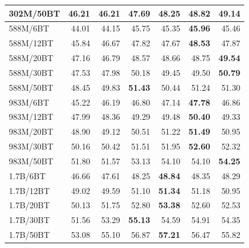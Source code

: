 \begin{table}[t]
{\begin{tabular}{lrrrrrr}
    302M/50BT & 46.21 & 46.21 & 47.69 & 48.25 & 48.82 & \textbf{49.14} \\
    \midrule
    588M/6BT & 44.01 & 44.15 & 45.75 & 45.35 & \textbf{45.96} & 45.46 \\
    588M/12BT & 45.84 & 46.67 & 47.82 & 47.67 & \textbf{48.53} & 47.87 \\
    588M/20BT & 47.16 & 46.79 & 48.57 & 48.66 & 48.75 & \textbf{49.54} \\
    588M/30BT & 47.53 & 47.98 & 50.18 & 49.45 & 49.50 & \textbf{50.79} \\
    588M/50BT & 48.45 & 49.83 & \textbf{51.43} & 50.44 & 51.24 & 51.30 \\
    \midrule
    983M/6BT & 45.22 & 46.19 & 46.80 & 47.14 & \textbf{47.78} & 46.86 \\
    983M/12BT & 47.99 & 48.36 & 49.29 & 49.48 & \textbf{50.40} & 49.33 \\
    983M/20BT & 48.90 & 49.12 & 50.51 & 51.22 & \textbf{51.49} & 50.95 \\
    983M/30BT & 50.16 & 50.42 & 51.51 & 51.95 & \textbf{52.60} & 52.32 \\
    983M/50BT & 51.80 & 51.57 & 53.13 & 54.10 & 54.10 & \textbf{54.25} \\
    \midrule
    1.7B/6BT & 46.66 & 47.61 & 48.25 & \textbf{48.84} & 48.35 & 48.29 \\
    1.7B/12BT & 49.02 & 49.59 & 51.10 & \textbf{51.34} & 51.18 & 50.95 \\
    1.7B/20BT & 50.13 & 51.75 & 52.80 & \textbf{53.38} & 52.60 & 52.53 \\
    1.7B/30BT & 51.56 & 53.29 & \textbf{55.13} & 54.59 & 54.91 & 54.35 \\
    1.7B/50BT & 53.08 & 55.10 & 56.87 & \textbf{57.21} & 56.47 & 55.82 \\
    \bottomrule
  \end{tabular}%
  }
\end{table}
